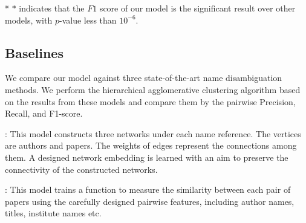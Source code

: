\documentclass[letterpaper]{article} %
\newcommand{\citet}[1]{{\citeauthor{#1} \shortcite{#1}}}
\begin{document}
\begin{table}[t]
\begin{center}
\vspace{0pt}
\caption{Results of author name disambiguation.}
\label{tb:allresult}
\footnotesize
{}
\begin{tablenotes}
\small \item[*] $*$ indicates that the $F1$ score of our model is the significant result over other models, with $p$-value less than $10^{-6}$.
\end{tablenotes}
\end{center}
\end{table}

\subsection{Baselines}
We compare our model against three state-of-the-art name disambiguation methods. We perform the hierarchical agglomerative clustering algorithm based on the results from these models and compare them by the pairwise Precision, Recall, and F1-score.

\textbf{\citet{Anonymized}}: This model constructs three networks under each name reference. The vertices are authors and papers. The weights of edges represent the connections among them. A designed network embedding is learned with an aim to preserve the connectivity of the constructed networks.

\textbf{\citet{Block}}: This model trains a function to measure the similarity between each pair of papers using the carefully designed pairwise features, including author names, titles, institute names etc.
\end{document}
